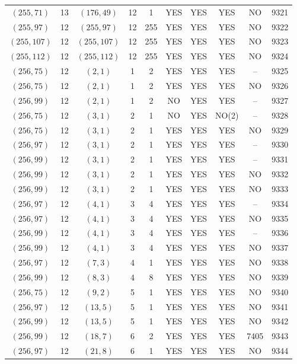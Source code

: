 \begin{longtable}{|c|c|c|c|c|c|c|c|c|c|}
$(255, 71)$ & 13 & $(176, 49)$ & 12 & 1 & YES & YES & YES & NO & 9321\\
$(255, 97)$ & 12 & $(255, 97)$ & 12 & 255 & YES & YES & YES & NO & 9322\\
$(255, 107)$ & 12 & $(255, 107)$ & 12 & 255 & YES & YES & YES & NO & 9323\\
$(255, 112)$ & 12 & $(255, 112)$ & 12 & 255 & YES & YES & YES & NO & 9324\\
$(256, 75)$ & 12 & $(2, 1)$ & 1 & 2 & YES & YES & YES & -- & 9325\\
$(256, 75)$ & 12 & $(2, 1)$ & 1 & 2 & YES & YES & YES & NO & 9326\\
$(256, 99)$ & 12 & $(2, 1)$ & 1 & 2 & NO & YES & YES & -- & 9327\\
$(256, 75)$ & 12 & $(3, 1)$ & 2 & 1 & NO & YES & NO(2) & -- & 9328\\
$(256, 75)$ & 12 & $(3, 1)$ & 2 & 1 & YES & YES & YES & NO & 9329\\
$(256, 97)$ & 12 & $(3, 1)$ & 2 & 1 & YES & YES & YES & -- & 9330\\
$(256, 99)$ & 12 & $(3, 1)$ & 2 & 1 & YES & YES & YES & -- & 9331\\
$(256, 99)$ & 12 & $(3, 1)$ & 2 & 1 & YES & YES & YES & NO & 9332\\
$(256, 99)$ & 12 & $(3, 1)$ & 2 & 1 & YES & YES & YES & NO & 9333\\
$(256, 97)$ & 12 & $(4, 1)$ & 3 & 4 & YES & YES & YES & -- & 9334\\
$(256, 97)$ & 12 & $(4, 1)$ & 3 & 4 & YES & YES & YES & NO & 9335\\
$(256, 99)$ & 12 & $(4, 1)$ & 3 & 4 & YES & YES & YES & -- & 9336\\
$(256, 99)$ & 12 & $(4, 1)$ & 3 & 4 & YES & YES & YES & NO & 9337\\
$(256, 97)$ & 12 & $(7, 3)$ & 4 & 1 & YES & YES & YES & NO & 9338\\
$(256, 99)$ & 12 & $(8, 3)$ & 4 & 8 & YES & YES & YES & NO & 9339\\
$(256, 75)$ & 12 & $(9, 2)$ & 5 & 1 & YES & YES & YES & NO & 9340\\
$(256, 97)$ & 12 & $(13, 5)$ & 5 & 1 & YES & YES & YES & NO & 9341\\
$(256, 99)$ & 12 & $(13, 5)$ & 5 & 1 & YES & YES & YES & NO & 9342\\
$(256, 99)$ & 12 & $(18, 7)$ & 6 & 2 & YES & YES & YES & 7405 & 9343\\
$(256, 97)$ & 12 & $(21, 8)$ & 6 & 1 & YES & YES & YES & NO & 9344\\

\end{longtable}
